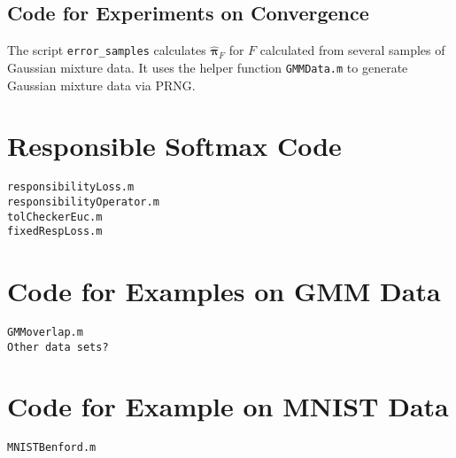 \section{Code for Experiments on Convergence}
The script \verb|error_samples| calculates \( \hat{\bm \pi}_F \) for \( F \) calculated from several samples of Gaussian mixture data. It uses the helper function \verb|GMMData.m| to generate Gaussian mixture data via PRNG.






\chapter{Responsible Softmax Code}
\begin{verbatim}
responsibilityLoss.m 
responsibilityOperator.m
tolCheckerEuc.m
fixedRespLoss.m
\end{verbatim}

\chapter{Code for Examples on GMM Data}
\begin{verbatim}
GMMoverlap.m 
Other data sets?
\end{verbatim}

\chapter{Code for Example on MNIST Data}
\begin{verbatim}
MNISTBenford.m
\end{verbatim}